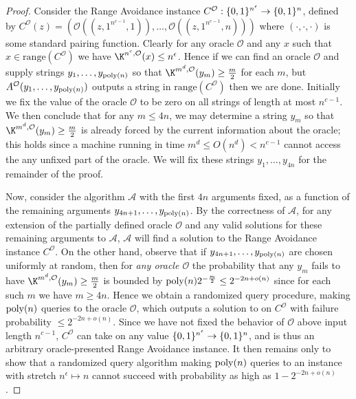 \begin{proof}
Consider the Range Avoidance instance $C^{\mathcal{O}}: \{0,1\}^{n^\epsilon} \to \{0,1\}^n$, defined by $C^{\mathcal{O}}(z) = (\mathcal{O}((z,1^{n^{c-1}},1)),\ldots, \mathcal{O}((z,1^{n^{c-1}},n)))$ where $(\cdot,\cdot,\cdot)$ is some standard pairing function. Clearly for any oracle $\mathcal{O}$ and any $x$ such that $x \in \mathrm{range}(C^\mathcal{O})$ we have $\K^{n^c, \mathcal{O}}(x) \leq n^\epsilon$. Hence if we can find an oracle $\mathcal{O}$ and supply strings $y_1,\ldots,y_{\mathrm{poly}(n)}$ so that $\K^{m^d, \mathcal{O}}(y_m) \geq \frac{m}{2}$ for each $m$, but $A^{\mathcal{O}}(y_1,\ldots,y_{\mathrm{poly}(n)})$ outputs a string in $\mathrm{range}(C^{\mathcal{O}})$ then we are done. Initially we fix the value of the oracle $\mathcal{O}$ to be zero on all strings of length at most $n^{c-1}$. We then conclude that for any $m \leq 4n$, we may determine a string $y_m$ so that $\K^{m^d, \mathcal{O}}(y_m) \geq \frac{m}{2}$ is already forced by the current information about the oracle; this holds since a machine running in time $m^d \leq O(n^d) < n^{c-1}$ cannot access the any unfixed part of the oracle. We will fix these strings $y_1,\ldots,y_{4n}$ for the remainder of the proof.

Now, consider the algorithm $\mathcal{A}$ with the first $4n$ arguments fixed, as a function of the remaining arguments $y_{4n+1},\ldots,y_{\mathrm{poly}(n)}$. By the correctness of $\mathcal{A}$, for any extension of the partially defined oracle $\mathcal{O}$ and any valid solutions for these remaining arguments to $\mathcal{A}$, $\mathcal{A}$ will find a solution to the Range Avoidance instance $C^{\mathcal{O}}$. On the other hand, observe that if $y_{4n+1},\ldots,y_{\mathrm{poly}(n)}$ are chosen uniformly at random, then for \emph{any oracle $\mathcal{O}$} the probability that any $y_m$ fails to have $\K^{m^d, \mathcal{O}}(y_m) \geq \frac{m}{2}$ is bounded by $\mathrm{poly}(n) 2^{-\frac{m}{2}} \leq 2^{ -2n + o(n)}$ since for each such $m$ we have $m \geq 4n$. Hence we obtain a randomized query procedure, making $\mathrm{poly}(n)$ queries to the oracle $\mathcal{O}$, which outputs a solution to \avoid on $C^{\mathcal{O}}$ with failure probability $\leq 2^{-2n + o(n)}$. Since we have not fixed the behavior of $\mathcal{O}$ above input length $n^{c-1}$, $C^{\mathcal{O}}$ can take on any value $\{0,1\}^{n^\epsilon} \to \{0,1\}^n$, and is thus an arbitrary oracle-presented Range Avoidance instance. It then remains only to show that a randomized query algorithm making $\mathrm{poly}(n)$ queries to an \avoid instance with stretch $n^{\epsilon} \mapsto n$ cannot succeed with probability as high as $1- 2^{-2n + o(n)}$.


\end{proof}
